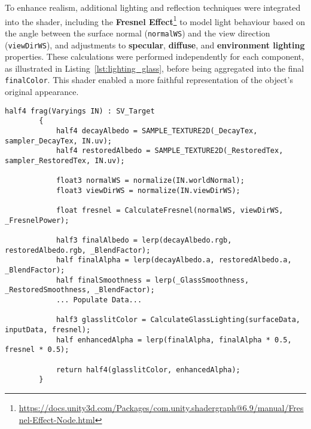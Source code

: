 To enhance realism, additional lighting and reflection techniques were integrated into the shader, including 
the \textbf{Fresnel Effect}\footnote{\url{https://docs.unity3d.com/Packages/com.unity.shadergraph@6.9/manual/Fresnel-Effect-Node.html}} to model light behaviour based on the angle between the surface normal (\texttt{normalWS}) and the view direction (\texttt{viewDirWS}), 
and adjustments to \textbf{specular}, \textbf{diffuse}, and \textbf{environment lighting} properties. 
These calculations were performed independently for each component, as illustrated in Listing~\ref{lst:lighting_glass}, before being aggregated into the final \texttt{finalColor}. 
This shader enabled a more faithful representation of the object's original appearance.

\begin{lstlisting}[language=HLSL, caption={Partial Fragment shader for blending original and restored textures.}, label={lst:shader_blend}]
        half4 frag(Varyings IN) : SV_Target
        {
            half4 decayAlbedo = SAMPLE_TEXTURE2D(_DecayTex, sampler_DecayTex, IN.uv);
            half4 restoredAlbedo = SAMPLE_TEXTURE2D(_RestoredTex, sampler_RestoredTex, IN.uv);

            float3 normalWS = normalize(IN.worldNormal);
            float3 viewDirWS = normalize(IN.viewDirWS);

            float fresnel = CalculateFresnel(normalWS, viewDirWS, _FresnelPower);

            half3 finalAlbedo = lerp(decayAlbedo.rgb, restoredAlbedo.rgb, _BlendFactor);
            half finalAlpha = lerp(decayAlbedo.a, restoredAlbedo.a, _BlendFactor);
            half finalSmoothness = lerp(_GlassSmoothness, _RestoredSmoothness, _BlendFactor);
            ... Populate Data...
            
            half3 glasslitColor = CalculateGlassLighting(surfaceData, inputData, fresnel);            
            half enhancedAlpha = lerp(finalAlpha, finalAlpha * 0.5, fresnel * 0.5);
            
            return half4(glasslitColor, enhancedAlpha);
        }
\end{lstlisting}


